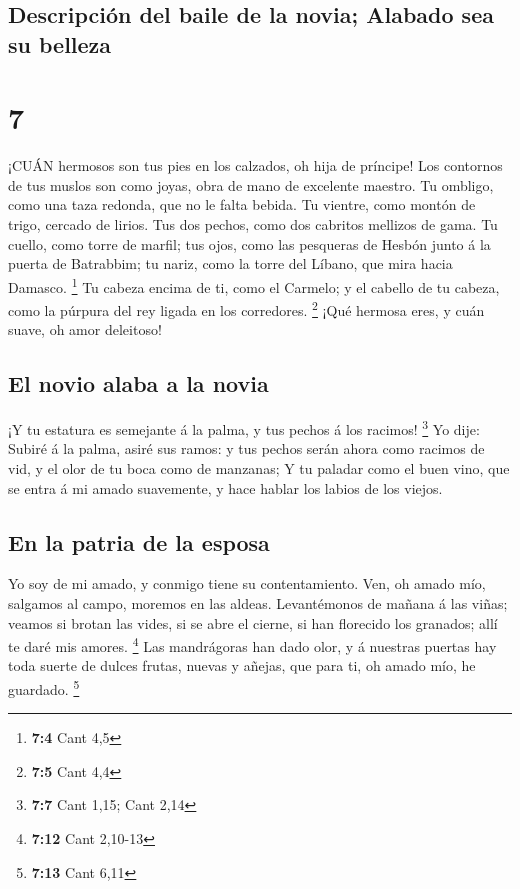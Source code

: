 \hypertarget{descripciuxf3n-del-baile-de-la-novia-alabado-sea-su-belleza}{%
\subsection{Descripción del baile de la novia; Alabado sea su
belleza}\label{descripciuxf3n-del-baile-de-la-novia-alabado-sea-su-belleza}}

\hypertarget{section-6}{%
\section{7}\label{section-6}}

 ¡CUÁN hermosos son tus pies en los calzados, oh hija de
príncipe! Los contornos de tus muslos son como joyas, obra de mano de
excelente maestro.  Tu ombligo, como una taza redonda, que
no le falta bebida. Tu vientre, como montón de trigo, cercado de lirios.
 Tus dos pechos, como dos cabritos mellizos de gama.
 Tu cuello, como torre de marfil; tus ojos, como las
pesqueras de Hesbón junto á la puerta de Batrabbim; tu nariz, como la
torre del Líbano, que mira hacia Damasco. \footnote{\textbf{7:4} Cant
  4,5}  Tu cabeza encima de ti, como el Carmelo; y el
cabello de tu cabeza, como la púrpura del rey ligada en los corredores.
\footnote{\textbf{7:5} Cant 4,4}  ¡Qué hermosa eres, y cuán
suave, oh amor deleitoso!

\hypertarget{el-novio-alaba-a-la-novia}{%
\subsection{El novio alaba a la novia}\label{el-novio-alaba-a-la-novia}}

 ¡Y tu estatura es semejante á la palma, y tus pechos á los
racimos! \footnote{\textbf{7:7} Cant 1,15; Cant 2,14}  Yo
dije: Subiré á la palma, asiré sus ramos: y tus pechos serán ahora como
racimos de vid, y el olor de tu boca como de manzanas;  Y tu
paladar como el buen vino, que se entra á mi amado suavemente, y hace
hablar los labios de los viejos.

\hypertarget{en-la-patria-de-la-esposa}{%
\subsection{En la patria de la esposa}\label{en-la-patria-de-la-esposa}}

 Yo soy de mi amado, y conmigo tiene su contentamiento.
 Ven, oh amado mío, salgamos al campo, moremos en las
aldeas.  Levantémonos de mañana á las viñas; veamos si
brotan las vides, si se abre el cierne, si han florecido los granados;
allí te daré mis amores. \footnote{\textbf{7:12} Cant 2,10-13}
 Las mandrágoras han dado olor, y á nuestras puertas hay
toda suerte de dulces frutas, nuevas y añejas, que para ti, oh amado
mío, he guardado. \footnote{\textbf{7:13} Cant 6,11}

